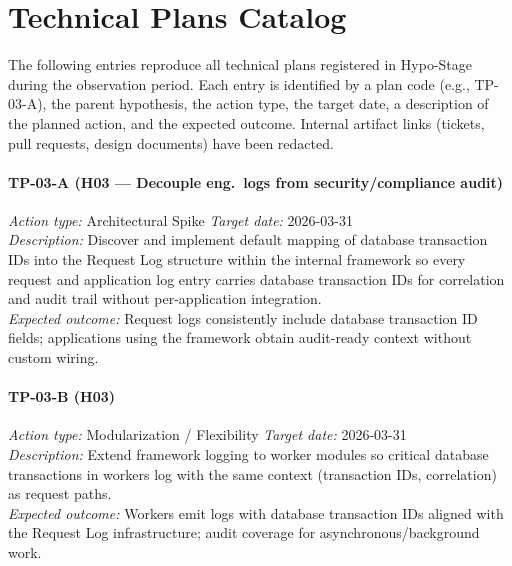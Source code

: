 \bigskip
\section{Technical Plans Catalog}
\label{sec:app-technical-plans}

The following entries reproduce all technical plans registered in Hypo-Stage
during the observation period. Each entry is identified by a plan code
(e.g., TP-03-A), the parent hypothesis, the action type, the target date, a
description of the planned action, and the expected outcome. Internal artifact
links (tickets, pull requests, design documents) have been redacted.

\vspace{6pt}

\paragraph{TP-03-A \textnormal{(H03 — Decouple eng.\ logs from security/compliance audit)}}
\textit{Action type:} Architectural Spike \quad \textit{Target date:} 2026-03-31 \\
\textit{Description:} Discover and implement default mapping of database
transaction IDs into the Request Log structure within the internal framework
so every request and application log entry carries database transaction IDs for
correlation and audit trail without per-application integration. \\
\textit{Expected outcome:} Request logs consistently include database transaction
ID fields; applications using the framework obtain audit-ready context without
custom wiring.

\paragraph{TP-03-B \textnormal{(H03)}}
\textit{Action type:} Modularization / Flexibility \quad \textit{Target date:} 2026-03-31 \\
\textit{Description:} Extend framework logging to worker modules so critical
database transactions in workers log with the same context (transaction IDs,
correlation) as request paths. \\
\textit{Expected outcome:} Workers emit logs with database transaction IDs
aligned with the Request Log infrastructure; audit coverage for
asynchronous/background work.

